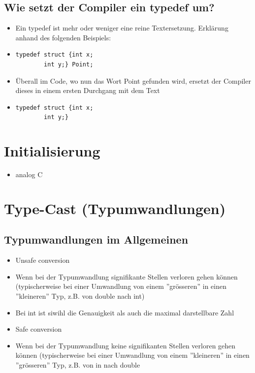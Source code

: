 \subsection{Wie setzt der Compiler ein typedef um?}
\label{sec:Wie setzt der Compiler ein typedef um?}
\begin{itemize}
	\item Ein typedef ist mehr oder weniger eine reine Textersetzung. Erklärung anhand des folgenden Beispiels:
	\item[\-]
\noindent
\begin{minipage}{\linewidth}
\begin{lstlisting}
typedef struct {int x;
		int y;} Point;
\end{lstlisting}
\end{minipage}
	\item Überall im Code, wo nun das Wort Point gefunden wird, ersetzt der Compiler dieses in einem ersten Durchgang mit dem Text 
	\item[\-]
\noindent
\begin{minipage}{\linewidth}
\begin{lstlisting}
typedef struct {int x;
		int y;}
\end{lstlisting}
\end{minipage}	
\end{itemize}

\section{Initialisierung}
\label{sec:Initialisierung}
\begin{itemize}
	\item analog C
\end{itemize}

\section{Type-Cast (Typumwandlungen)}
\label{sec:Type-Case (Typumwandlungen)}

\subsection{Typumwandlungen im Allgemeinen}
\label{sec:Typumwandlungen im Allgemeinen}
\begin{itemize}
	\item Unsafe conversion
	\item[\-] Wenn bei der Typumwandlung signifikante Stellen verloren gehen können (typischerweise bei einer Umwandlung von einem ''grösseren'' in einen ''kleineren'' Typ, z.B. von double nach int)
	\item[\-] Bei int ist siwihl die Genauigkeit als auch die maximal darstellbare Zahl
	\item Safe conversion
	\item[\-] Wenn bei der Typumwandlung keine signifikanten Stellen verloren gehen können (typischerweise bei einer Umwandlung von einem ''kleineren'' in einen ''grösseren'' Typ, z.B. von in nach double
\end{itemize}

